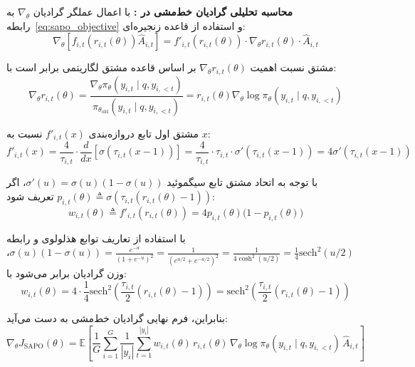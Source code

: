 \textbf{محاسبه تحلیلی گرادیان خط‌مشی در :}
با اعمال عملگر گرادیان $\nabla_\theta$ به رابطه~\eqref{eq:sapo_objective} و استفاده از قاعده زنجیره‌ای:
\begin{equation}
	\label{eq:grad_chain_rule}
	\nabla_\theta \left[ f_{i,t}(r_{i,t}(\theta)) \hat{A}_{i,t} \right] = f'_{i,t}(r_{i,t}(\theta)) \cdot \nabla_\theta r_{i,t}(\theta) \cdot \hat{A}_{i,t}
\end{equation}

مشتق نسبت اهمیت $\nabla_\theta r_{i,t}(\theta)$ بر اساس قاعده مشتق لگاریتمی برابر است با:
\begin{equation}
	\label{eq:grad_ratio}
	\nabla_\theta r_{i,t}(\theta) = \frac{\nabla_\theta \pi_\theta(y_{i,t} \mid q, y_{i,<t})}{\pi_{\theta_{\text{old}}}(y_{i,t} \mid q, y_{i,<t})} = r_{i,t}(\theta) \nabla_\theta \log \pi_\theta(y_{i,t} \mid q, y_{i,<t})
\end{equation}

مشتق اول تابع دروازه‌بندی $f'_{i,t}(x)$ نسبت به $x$:
\begin{equation}
	\label{eq:f_prime_derivation}
	f'_{i,t}(x) = \frac{4}{\tau_{i,t}} \cdot \frac{d}{dx}\left[ \sigma\left(\tau_{i,t} (x - 1)\right) \right] = \frac{4}{\tau_{i,t}} \cdot \tau_{i,t} \cdot \sigma'\left(\tau_{i,t} (x - 1)\right) = 4 \sigma'\left(\tau_{i,t} (x - 1)\right)
\end{equation}

با توجه به اتحاد مشتق تابع سیگموئید $\sigma'(u) = \sigma(u)(1 - \sigma(u))$، اگر $p_{i,t}(\theta) \triangleq \sigma(\tau_{i,t} (r_{i,t}(\theta) - 1))$ تعریف شود:
\begin{equation}
	\label{eq:weight_def}
	w_{i,t}(\theta) \triangleq f'_{i,t}(r_{i,t}(\theta)) = 4 p_{i,t}(\theta) \big(1 - p_{i,t}(\theta)\big)
\end{equation}

با استفاده از تعاریف توابع هذلولوی و رابطه $\sigma(u)(1-\sigma(u)) = \frac{e^{-u}}{(1+e^{-u})^2} = \frac{1}{(e^{u/2}+e^{-u/2})^2} = \frac{1}{4\cosh^2(u/2)} = \frac{1}{4}\text{sech}^2(u/2)$، وزن گرادیان برابر می‌شود با:
\begin{equation}
	\label{eq:weight_sech}
	w_{i,t}(\theta) = 4 \cdot \frac{1}{4} \text{sech}^2\left(\frac{\tau_{i,t}}{2} (r_{i,t}(\theta) - 1)\right) = \text{sech}^2\left(\frac{\tau_{i,t}}{2} (r_{i,t}(\theta) - 1)\right)
\end{equation}

بنابراین، فرم نهایی گرادیان خط‌مشی به دست می‌آید:
\begin{equation}
	\label{eq:final_sapo_gradient}
	\nabla_\theta J_{\text{SAPO}}(\theta) = \mathbb{E} \left[ \frac{1}{G} \sum_{i=1}^G \frac{1}{|y_i|} \sum_{t=1}^{|y_i|} w_{i,t}(\theta) \, r_{i,t}(\theta) \, \nabla_\theta \log \pi_\theta(y_{i,t} \mid q, y_{i,<t}) \, \hat{A}_{i,t} \right]
\end{equation}

